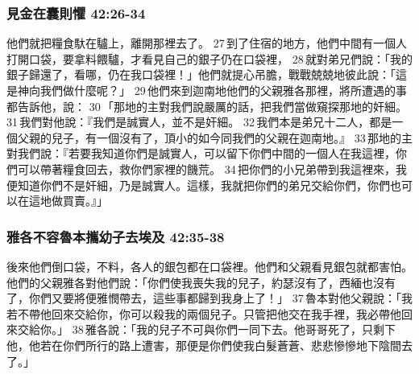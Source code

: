 \subsubsection{見金在囊則懼 42:26-34} 
他們就把糧食馱在驢上，離開那裡去了。 27 到了住宿的地方，他們中間有一個人打開口袋，要拿料餵驢，才看見自己的銀子仍在口袋裡， 28 就對弟兄們說：「我的銀子歸還了，看哪，仍在我口袋裡！」他們就提心吊膽，戰戰兢兢地彼此說：「這是神向我們做什麼呢？」 29 他們來到迦南地他們的父親雅各那裡，將所遭遇的事都告訴他，說： 30 「那地的主對我們說嚴厲的話，把我們當做窺探那地的奸細。 31 我們對他說：『我們是誠實人，並不是奸細。 32 我們本是弟兄十二人，都是一個父親的兒子，有一個沒有了，頂小的如今同我們的父親在迦南地。』 33 那地的主對我們說：『若要我知道你們是誠實人，可以留下你們中間的一個人在我這裡，你們可以帶著糧食回去，救你們家裡的饑荒。 34 把你們的小兄弟帶到我這裡來，我便知道你們不是奸細，乃是誠實人。這樣，我就把你們的弟兄交給你們，你們也可以在這地做買賣。』」

\subsubsection{雅各不容魯本攜幼子去埃及 42:35-38}
後來他們倒口袋，不料，各人的銀包都在口袋裡。他們和父親看見銀包就都害怕。他們的父親雅各對他們說：「你們使我喪失我的兒子，約瑟沒有了，西緬也沒有了，你們又要將便雅憫帶去，這些事都歸到我身上了！」 37 魯本對他父親說：「我若不帶他回來交給你，你可以殺我的兩個兒子。只管把他交在我手裡，我必帶他回來交給你。」 38 雅各說：「我的兒子不可與你們一同下去。他哥哥死了，只剩下他，他若在你們所行的路上遭害，那便是你們使我白髮蒼蒼、悲悲慘慘地下陰間去了。」

